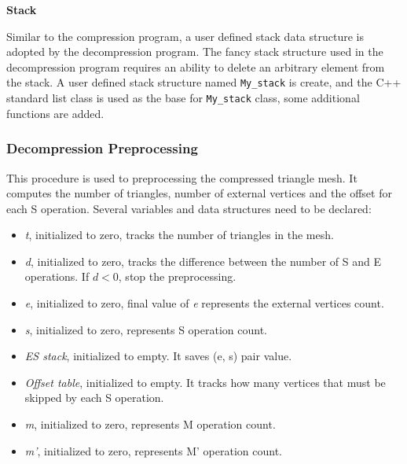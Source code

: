 \documentclass[onecolumn, 12pt]{article}
\begin{document}
\vspace{1em}
{\setlength\parindent{0pt}
\textbf{Stack}\vspace{0.5em}}

Similar to the compression program, a user defined stack data structure is adopted by the decompression program. The fancy stack structure used in the decompression program requires an ability to delete an arbitrary element from the stack. A user defined stack structure named \lstinline!My_stack! is create, and the C++ standard list class is used as the base for \lstinline!My_stack! class, some additional functions are added.


\subsubsection{Decompression Preprocessing}
This procedure is used to preprocessing the compressed triangle mesh. It computes the number of triangles, number of external vertices and the offset for each S operation. Several variables and data structures need to be declared:

\begin{itemize}\itemsep=1.5pt
\item {\it t}, initialized to zero, tracks the number of triangles in the mesh.
\item {\it d}, initialized to zero, tracks the difference between the number of S and E operations. If $d < 0$, stop the preprocessing.
\item {\it e}, initialized to zero, final value of {\it e} represents the external vertices count.
\item {\it s}, initialized to zero, represents S operation count.
\item {\it ES stack}, initialized to empty. It saves (e, s) pair value.
\item {\it Offset table}, initialized to empty. It tracks how many vertices that must be skipped by each S operation.
\item {\it m}, initialized to zero, represents M operation count.
\item {\it m'}, initialized to zero, represents M' operation count.
\end{itemize}
\end{document}
